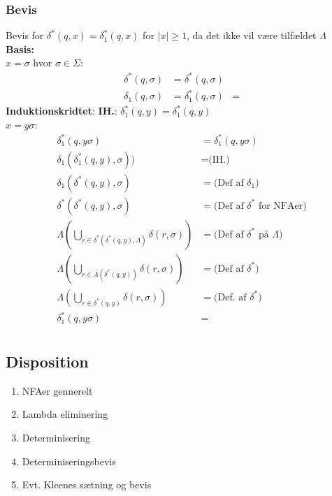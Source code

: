 \documentclass[a4, danish]{article}
\begin{document}
\subsubsection{Bevis}
  Bevis for $\delta^*(q,x)=\delta_1^*(q,x)$ for $|x| \geq 1$, da det ikke vil være tilfældet $\Lambda$ \\
  \textbf{Basis:} \\
  $x=\sigma$ hvor $\sigma \in \Sigma$:
  \begin{align*}
    \delta^*(q,\sigma) &= \delta^*(q,\sigma) \\
    \delta_1(q,\sigma) &=
    \delta_1^*(q,\sigma) &=
  \end{align*}
  \textbf{Induktionskridtet}:
  \textbf{IH.}: $\delta_1^*(q,y)=\delta_1^*(q,y)$ \\
  $x=y\sigma$:
  \begin{align*}
    \delta_1^*(q,y\sigma)&=\delta_1^*(q,y\sigma) \\
    \delta_1(\delta_1^*(q,y),\sigma))&= \text{(IH.)}  \\
    \delta_1(\delta^*(q,y),\sigma)&= \text{(Def af $\delta_1$)} \\
    \delta^*(\delta^*(q,y),\sigma)&= \text{(Def af $\delta^*$ for NFAer)}\\
    \Lambda(\bigcup_{r \in \delta^*(\delta^*(q,y), \Lambda)}\delta(r,\sigma))  &= \text{(Def af $\delta^*$ på $\Lambda$)} \\
    \Lambda(\bigcup_{r \in \Lambda(\delta^*(q,y))}\delta(r,\sigma)) &= \text{(Def af $\delta^*$)} \\ 
    \Lambda(\bigcup_{r \in \delta^*(q,y)}\delta(r,\sigma)) &= \text{(Def. af $\delta^*$)} \\
    \delta_1^*(q,y\sigma) &= \\
  \end{align*}  

\newpage
\subsection{Disposition}
\begin{enumerate}
  \item NFAer gennerelt
  \item Lambda eliminering 
  \item Determinisering
  \item Determiniseringsbevis
  \item Evt. Kleenes sætning og bevis
\end{enumerate}

\newpage
\end{document}
